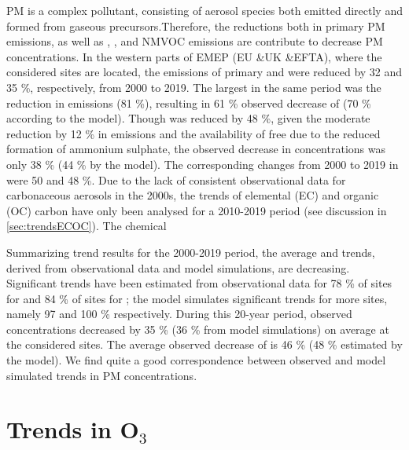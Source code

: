 PM is a complex pollutant, consisting of aerosol species both emitted
directly and formed from gaseous precursors.Therefore, the reductions both in primary PM emissions, as well as \sox, \noii, \nhiii and NMVOC emissions are contribute to decrease PM concentrations. In the western parts of EMEP (EU \&UK \&EFTA), where the considered sites are located, the emissions of primary \PM[10] and \PM[2.5] were reduced by 32 and 35 \%, respectively, from 2000 to 2019. The largest in the same period was the reduction in \sox emissions (81 \%), resulting in 61 \% observed decrease of \soiv (70 \% according to the model). Though \noii was reduced by 48 \%, given the moderate reduction by 12 \% in \nhiii emissions and the availability of free \nhiii due to the reduced formation of ammonium sulphate, the observed decrease in \noiii concentrations was only 38 \% (44 \% by the model). The corresponding changes from 2000 to 2019 in \nhiv were 50 and 48 \%. Due to the lack of consistent observational data for carbonaceous aerosols in the 2000s, the trends of elemental (EC) and organic (OC) carbon have only been analysed for a 2010-2019 period (see discussion in \ref{sec:trendsECOC}). The chemical  

Summarizing trend results for the 2000-2019 period, the average \PM[10] and \PM[2.5] trends, derived from observational data and model simulations, are decreasing. Significant trends have been estimated from observational data for 78 \% of sites for \PM[10] and 84 \% of sites for \PM[2.5]; the model simulates significant trends for more sites, namely 97 and 100 \% respectively. During this 20-year period, observed \PM[10] concentrations decreased by 35 \%  (36 \% from model simulations) on average at the considered sites. The average observed decrease of \PM[2.5] is 46 \%  (48 \% estimated by the model). We find quite a good correspondence between observed and model simulated trends in PM concentrations. 



\clearpage
\section{\label{sec:Trends_O3}Trends in O$_3$ }

